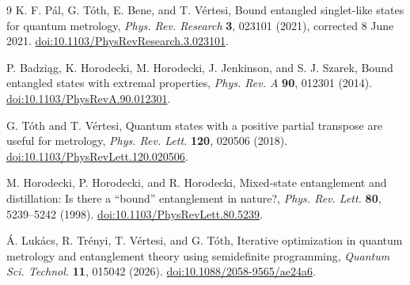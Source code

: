 \documentclass[11pt]{article}
\begin{document}
\begingroup\small
\begin{thebibliography}{9}
K. F. P\'al, G. T\'oth, E. Bene, and T. V\'ertesi,
Bound entangled singlet-like states for quantum metrology,
\emph{Phys. Rev. Research} \textbf{3}, 023101 (2021), corrected 8 June 2021.
\href{https://doi.org/10.1103/PhysRevResearch.3.023101}{doi:10.1103/PhysRevResearch.3.023101}.

P. Badzi\k{a}g, K. Horodecki, M. Horodecki, J. Jenkinson, and S. J. Szarek,
Bound entangled states with extremal properties,
\emph{Phys. Rev. A} \textbf{90}, 012301 (2014).
\href{https://doi.org/10.1103/PhysRevA.90.012301}{doi:10.1103/PhysRevA.90.012301}.

G. T\'oth and T. V\'ertesi,
Quantum states with a positive partial transpose are useful for metrology,
\emph{Phys. Rev. Lett.} \textbf{120}, 020506 (2018).
\href{https://doi.org/10.1103/PhysRevLett.120.020506}{doi:10.1103/PhysRevLett.120.020506}.

M. Horodecki, P. Horodecki, and R. Horodecki,
Mixed-state entanglement and distillation: Is there a ``bound'' entanglement in nature?,
\emph{Phys. Rev. Lett.} \textbf{80}, 5239--5242 (1998).
\href{https://doi.org/10.1103/PhysRevLett.80.5239}{doi:10.1103/PhysRevLett.80.5239}.

\'A. Luk\'acs, R. Tr\'enyi, T. V\'ertesi, and G. T\'oth,
Iterative optimization in quantum metrology and entanglement theory using
semidefinite programming,
\emph{Quantum Sci. Technol.} \textbf{11}, 015042 (2026).
\href{https://doi.org/10.1088/2058-9565/ae24a6}{doi:10.1088/2058-9565/ae24a6}.
\end{thebibliography}
\endgroup
\end{document}
